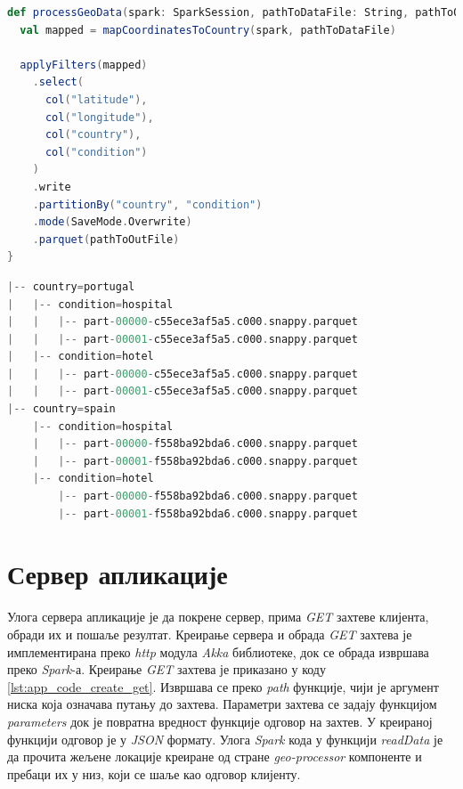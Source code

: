 \documentclass[12pt,oneside]{memoir}
\begin{document}
\begin{lstlisting}[caption={Функција \textit{processGeoData}}, language=Scala, label={lst:app_code_process_geo_data}]
def processGeoData(spark: SparkSession, pathToDataFile: String, pathToOutFile: String): Unit = {
  val mapped = mapCoordinatesToCountry(spark, pathToDataFile)

  applyFilters(mapped)
    .select(
      col("latitude"),
      col("longitude"),
      col("country"),
      col("condition")
    )
    .write
    .partitionBy("country", "condition")
    .mode(SaveMode.Overwrite)
    .parquet(pathToOutFile)
}
\end{lstlisting}

\begin{lstlisting}[caption={Структура директоријума партиционисаног по државама и врстама локација}, language=Scala, label={lst:app_code_partition_by_countries}]
|-- country=portugal
|   |-- condition=hospital
|   |   |-- part-00000-c55ece3af5a5.c000.snappy.parquet
|   |   |-- part-00001-c55ece3af5a5.c000.snappy.parquet
|   |-- condition=hotel
|   |   |-- part-00000-c55ece3af5a5.c000.snappy.parquet
|   |   |-- part-00001-c55ece3af5a5.c000.snappy.parquet
|-- country=spain
    |-- condition=hospital
    |   |-- part-00000-f558ba92bda6.c000.snappy.parquet
    |   |-- part-00001-f558ba92bda6.c000.snappy.parquet
    |-- condition=hotel
        |-- part-00000-f558ba92bda6.c000.snappy.parquet
        |-- part-00001-f558ba92bda6.c000.snappy.parquet
\end{lstlisting}

\section{Сервер апликације}
\label{sec:app_server}

Улога сервера апликације је да покрене сервер, прима \textit{GET} захтеве клијента, обради их и пошаље резултат. Креирање сервера и обрада \textit{GET} захтева је имплементирана преко \textit{http} модула \textit{Akka} библиотеке, док се обрада извршава преко \textit{Spark}-а. Креирање \textit{GET} захтева је приказано у коду \ref{lst:app_code_create_get}. Извршава се преко \textit{path} функције, чији је аргумент ниска која означава путању до захтева. Параметри захтева се задају функцијом \textit{parameters} док је повратна вредност функције одговор на захтев. У креираној функцији одговор је у \textit{JSON} формату. Улога \textit{Spark} кода у функцији \textit{readData} је да прочита жељене локације креиране од стране \textit{geo-processor} компоненте и пребаци их у низ, који се шаље као одговор клијенту.
\end{document}
